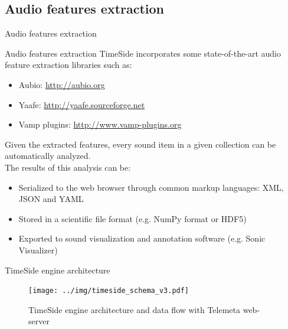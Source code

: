 \documentclass[final, hyperref, table]{beamer}
\begin{document}
\subsection{Audio features extraction}
\begin{frame}{Audio features extraction}
\begin{block}{Audio features extraction}
TimeSide incorporates some state-of-the-art \alert{audio feature extraction libraries} such as:
\vspace{-0.1cm}
\begin{itemize}
\item Aubio:
    \colorbox{yellow!30}{ \scriptsize \url{http://aubio.org}}
\vspace{-0.1cm}
\item Yaafe:
    \colorbox{yellow!30}{\scriptsize \url{http://yaafe.sourceforge.net}}
\vspace{-0.1cm}
\item Vamp plugins:  
    \colorbox{yellow!30}{\scriptsize \url{http://www.vamp-plugins.org}}
\end{itemize}

Given the extracted features, every sound item in a given
  collection can be automatically analyzed.\\
The results of this
  analysis can be:
  \begin{itemize}\footnotesize
 \item Serialized to the web browser through common markup languages:
    XML, JSON and YAML
  \item Stored in a scientific file format (e.g. NumPy format or
    HDF5)
  \item Exported to sound visualization and annotation software
    (e.g. Sonic Visualizer)
 
  \end{itemize}
\end{block}

\end{frame}
\begin{frame}{TimeSide engine architecture}
  \begin{figure}[htbp]
  \centering
  \texttt{[image: ../img/timeside\_schema\_v3.pdf]}
  \caption{TimeSide engine architecture and data flow with Telemeta web-server}\label{fig:TimeSide_Archi}
\end{figure}
\end{frame}
  
   
\end{document}
